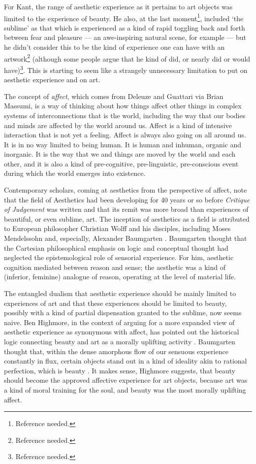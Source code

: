 \documentclass[letterpaper]{article}
\begin{document}
        For Kant, the range of aesthetic experience as it pertains to art objects was limited to the experience of beauty.  He also, at the last moment\footnote{Reference needed.}, included ‘the sublime’ as that which is experienced as a kind of rapid toggling back and forth between fear and pleasure — an awe-inspiring natural scene, for example — but he didn't consider this to be the kind of experience one can have with an artwork\footnote{Reference needed.} (although some people argue that he kind of did, or nearly did or would have)\footnote{Reference needed.}. This is starting to seem like a strangely unnecessary limitation to put on aesthetic experience and on art. 
        
        The concept of \emph{affect}, which comes from Deleuze and Guattari via Brian Massumi, is a way of thinking about how things affect other things in complex systems of interconnections that is the world, including the way that our bodies and minds are affected by the world around us. Affect is a kind of intensive interaction that is not yet a feeling. Affect is always also going on all around us. It is in no way limited to being human. It is human and inhuman, organic and inorganic. It is the way that we and things are moved by the world and each other, and it is also a kind of pre-cognitive, pre-linguistic, pre-conscious event during which the world emerges into existence. 
        
        Contemporary scholars, coming at aesthetics from the perspective of affect, note that the field of Aesthetics had been developing for 40 years or so before \emph{Critique of Judgement} was written and that its remit was more broad than experiences of beautiful, or even sublime, art. The inception of aesthetics as a field is attributed to European philosopher Christian Wolff and his disciples, including Moses Mendelssohn and, especially, Alexander Baumgarten \citep[pp.327-338]{EagletonFrPrtclrs1990}. Baumgarten thought that the Cartesian philosophical emphasis on logic and conceptual thought had neglected the epistemological role of sensorial experience. For him, aesthetic cognition mediated between reason and sense; the aesthetic was a kind of (inferior, feminine) analogue of reason, operating at the level of material life. 
        
        The entangled dualism that aesthetic experience should be mainly limited to experiences of art and that these experiences should be limited to beauty, possibly with a kind of partial dispensation granted to the sublime, now seems naive. Ben Highmore, in the context of arguing for a more expanded view of aesthetic experience as synonymous with affect, has pointed out the historical logic connecting beauty and art as a morally uplifting activity \citep[p.121-122]{HighmoreBttrAftrTst2010}. Baumgarten thought that, within the dense amorphous flow of our sensuous experience constantly in flux, certain objects stand out in a kind of ideality akin to rational perfection, which is beauty \citep[p.328]{EagletonFrPrtclrs1990}. It makes sense, Highmore suggests, that beauty should become the approved affective experience for art objects, because art was a kind of moral training for the soul, and beauty was the most morally uplifting affect.
        
\end{document}
